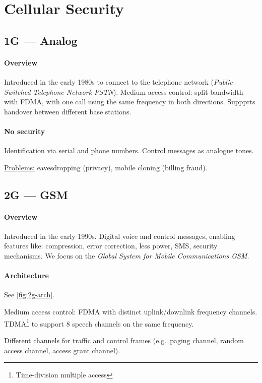 \section{Cellular Security}

\subsection{1G --- Analog}

\paragraph{Overview}
Introduced in the early 1980s to connect to the telephone network
(\textit{Public Switched Telephone Network PSTN}). Medium access control: split
bandwidth with FDMA, with one call using the same frequency in both directions.
Suppprts handover between different base stations.

\paragraph{No security}
Identification via serial and phone numbers. Control messages as analogue
tones.

\underline{Problems:} eavesdropping (privacy), mobile cloning (billing fraud).

\subsection{2G --- GSM}

\paragraph{Overview}
Introduced in the early 1990s. Digital voice and control messages, enabling
features like: compression, error correction, less power, SMS, security
mechanisms. We focus on the \textit{Global System for Mobile Communications
	GSM}.

\paragraph{Architecture}
See \autoref{fig:2g-arch}.

Medium access control: FDMA with distinct uplink/downlink frequency channels.
TDMA\footnote{Time-division multiple access} to support 8 speech channels on
the same frequency.

Different channels for traffic and control frames (e.g.\ paging channel, random
access channel, access grant channel).

